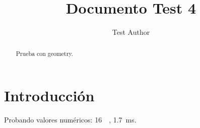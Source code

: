 \documentclass[conference,a4paper]{IEEEtran}
\begin{document}
\title{Documento Test 4}
\author{Test Author}
\maketitle

\begin{abstract}
Prueba con geometry.
\end{abstract}

\section{Introducción}
Probando valores numéricos: \SI{16}{\giga\byte}, \SI{1.7}{\milli\second}.
\end{document}
